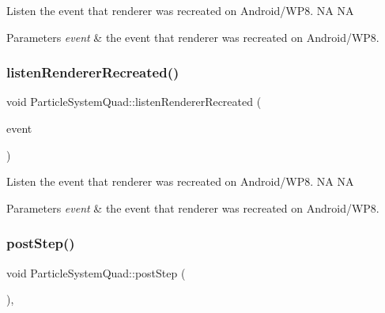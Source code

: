 Listen the event that renderer was recreated on Android/\+W\+P8.  NA  NA


\begin{DoxyParams}{Parameters}
{\em event} & the event that renderer was recreated on Android/\+W\+P8. \\
\hline
\end{DoxyParams}
\mbox{\label{classParticleSystemQuad_aa133fa205fb39f435a9b46545612fd42}} 
\subsubsection{\texorpdfstring{listen\+Renderer\+Recreated()}{listenRendererRecreated()}\hspace{0.1cm}{\footnotesize\ttfamily [2/2]}}
{\footnotesize\ttfamily void Particle\+System\+Quad\+::listen\+Renderer\+Recreated (\begin{DoxyParamCaption}\item[{\hyperlink{classEventCustom}{Event\+Custom} $\ast$}]{event }\end{DoxyParamCaption})}

Listen the event that renderer was recreated on Android/\+W\+P8.  NA  NA


\begin{DoxyParams}{Parameters}
{\em event} & the event that renderer was recreated on Android/\+W\+P8. \\
\hline
\end{DoxyParams}
\mbox{\label{classParticleSystemQuad_a01acd79f49bb71657e40e856d9d7456b}} 
\subsubsection{\texorpdfstring{post\+Step()}{postStep()}\hspace{0.1cm}{\footnotesize\ttfamily [1/2]}}
{\footnotesize\ttfamily void Particle\+System\+Quad\+::post\+Step (\begin{DoxyParamCaption}{ }\end{DoxyParamCaption})\hspace{0.3cm}{\ttfamily [override]}, {\ttfamily [virtual]}}

